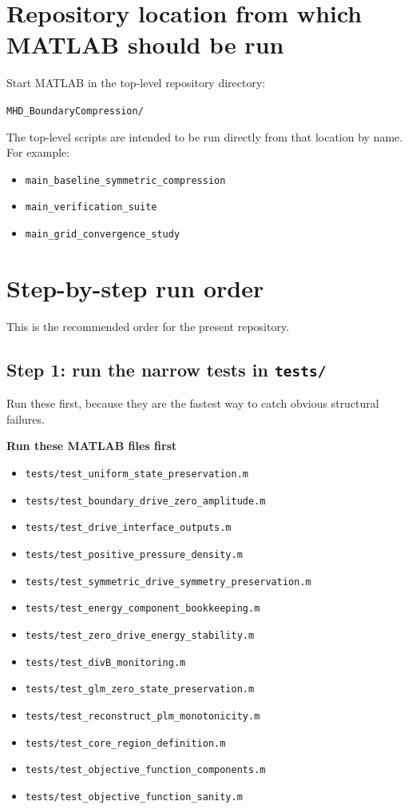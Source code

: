 \documentclass[11pt]{article}
\begin{document}
\section{Repository location from which MATLAB should be run}
Start MATLAB in the top-level repository directory:
\begin{center}
\texttt{MHD\_BoundaryCompression/}
\end{center}
The top-level scripts are intended to be run directly from that location by name. For example:
\begin{itemize}[leftmargin=1.8em]
    \item \texttt{main\_baseline\_symmetric\_compression}
    \item \texttt{main\_verification\_suite}
    \item \texttt{main\_grid\_convergence\_study}
\end{itemize}

\section{Step-by-step run order}
This is the recommended order for the present repository.

\subsection{Step 1: run the narrow tests in \texttt{tests/}}
Run these first, because they are the fastest way to catch obvious structural failures.

\begin{physicsbox}
\textbf{Run these MATLAB files first}
\begin{itemize}[leftmargin=1.8em]
    \item \texttt{tests/test\_uniform\_state\_preservation.m}
    \item \texttt{tests/test\_boundary\_drive\_zero\_amplitude.m}
    \item \texttt{tests/test\_drive\_interface\_outputs.m}
    \item \texttt{tests/test\_positive\_pressure\_density.m}
    \item \texttt{tests/test\_symmetric\_drive\_symmetry\_preservation.m}
    \item \texttt{tests/test\_energy\_component\_bookkeeping.m}
    \item \texttt{tests/test\_zero\_drive\_energy\_stability.m}
    \item \texttt{tests/test\_divB\_monitoring.m}
    \item \texttt{tests/test\_glm\_zero\_state\_preservation.m}
    \item \texttt{tests/test\_reconstruct\_plm\_monotonicity.m}
    \item \texttt{tests/test\_core\_region\_definition.m}
    \item \texttt{tests/test\_objective\_function\_components.m}
    \item \texttt{tests/test\_objective\_function\_sanity.m}
\end{itemize}
\end{physicsbox}
\end{document}

